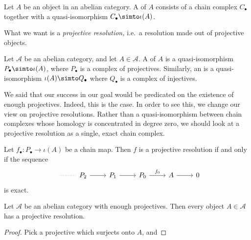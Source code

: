 \documentclass[main.tex]{subfiles}
\begin{document}
\begin{definition}[resolution]
  \label{def:resolution}
  Let $A$ be an object in an abelian category. A  of $A$ consists of a chain complex $C_{\bullet}$ together with a quasi-isomorphism $C_{\bullet} \simto \iota(A)$.
\end{definition}

What we want is a \emph{projective resolution,} i.e.\ a resolution made out of projective objects.

\begin{definition}
  \label{def:projective_injective_resolution}
  Let $\mathcal{A}$ be an abelian category, and let $A \in \mathcal{A}$. A  of $A$ is a quasi-isomorphism $P_{\bullet} \simto \iota(A)$, where $P_{\bullet}$ is a complex of projectives. Similarly, an  is a quasi-isomorphism $\iota(A) \simto Q_{\bullet}$ where $Q_{\bullet}$ is a complex of injectives.
\end{definition}


We said that our success in our goal would be predicated on the existence of enough projectives. Indeed, this is the case. In order to see this, we change our view on projective resolutions. Rather than a quasi-isomorphism between chain complexes whose homology is concentrated in degree zero, we should look at a projective resolution as a single, exact chain complex.

\begin{lemma}
  \label{lemma:equivalent_characterization_of_projective_resolution}
  Let $f_{\bullet}\colon P_{\bullet} \to \iota(A)$ be a chain map. Then $f$ is a projective resolution if and only if the sequence
  \begin{equation*}
    \begin{tikzcd}
      \
      \arrow[r, dotted, no head]
      & P_{2}
      \arrow[r]
      & P_{1}
      \arrow[r]
      & P_{0}
      \arrow[r, "f_{0}"]
      & A
      \arrow[r]
      & 0
    \end{tikzcd}
  \end{equation*}
  is exact.
\end{lemma}

\begin{proposition}
  Let $\mathcal{A}$ be an abelian category with enough projectives. Then every object $A \in \mathcal{A}$ has a projective resolution.
\end{proposition}
\begin{proof}
  Pick a projective which surjects onto $A$, and
\end{proof}
\end{document}
